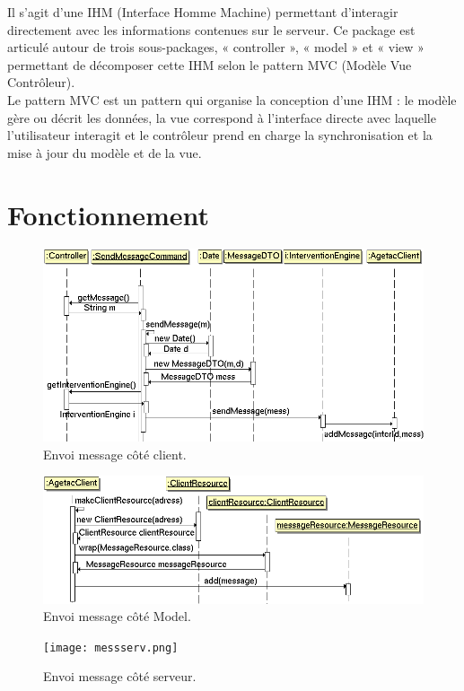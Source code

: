 \documentclass{article}
\begin{document}
Il s'agit d'une IHM (Interface Homme Machine) permettant d'interagir directement avec les informations contenues sur le serveur. Ce package est articulé autour de trois sous-packages, « controller », « model » et « view » permettant de décomposer cette IHM selon le pattern MVC (Modèle Vue Contrôleur).\\

Le pattern MVC est un pattern qui organise la conception d'une IHM : le modèle gère ou décrit les données, la vue correspond à l'interface directe avec laquelle l'utilisateur interagit et le contrôleur prend en charge la synchronisation et la mise à jour du modèle et de la vue.\\

\newpage
\section{Fonctionnement}


\begin{figure}[htbp]
\begin{center}
\includegraphics[width=460pt]{doc_dev-fig012.png}
\caption{Envoi message côté client.}
\end{center}
\end{figure}

\begin{figure}[htbp]
\begin{center}
\includegraphics[width=460pt]{doc_dev-fig013.png}
\caption{Envoi message côté Model.}
\end{center}
\end{figure}

\begin{figure}[htbp]
\begin{center}
\texttt{[image: messserv.png]}
\caption{Envoi message côté serveur.}
\end{center}
\end{figure}
\end{document}
